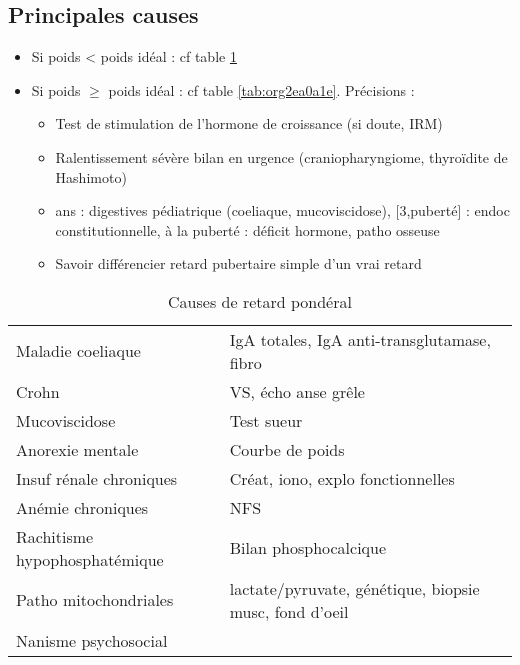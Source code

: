 \documentclass[11pt]{article}
\begin{document}
\subsection{Principales causes}
\label{sec:org0993a36}
\begin{itemize}
\item Si poids < poids idéal : cf table \ref{tab:org77e0293}
\item Si poids \(\ge\) poids idéal : cf table \ref{tab:org2ea0a1e}. Précisions :
\begin{itemize}
\item Test de stimulation de l'hormone de croissance (\danger si doute, IRM)
\item Ralentissement sévère \thus bilan en urgence (craniopharyngiome, thyroïdite de
Hashimoto) \skull
\item\relax [0, 3] ans : digestives pédiatrique (coeliaque, mucoviscidose), [3,puberté] :
endoc constitutionnelle, à la puberté : déficit hormone, patho osseuse
\item Savoir différencier retard pubertaire simple d'un vrai retard
\end{itemize}
\end{itemize}

\begin{table}[htbp]
\caption{\label{tab:org77e0293}
Causes de retard pondéral}
\centering
\begin{tabular}{ll}
\toprule
Maladie coeliaque & IgA totales, IgA anti-transglutamase, fibro\\
Crohn & VS, écho anse grêle\\
Mucoviscidose & Test sueur\\
Anorexie mentale & Courbe de poids\\
Insuf rénale chroniques & Créat, iono, explo fonctionnelles\\
Anémie chroniques & NFS\\
Rachitisme hypophosphatémique & Bilan phosphocalcique\\
Patho mitochondriales & lactate/pyruvate, génétique, biopsie musc, fond d'oeil\\
Nanisme psychosocial & \\
\bottomrule
\end{tabular}
\end{table}
\end{document}
